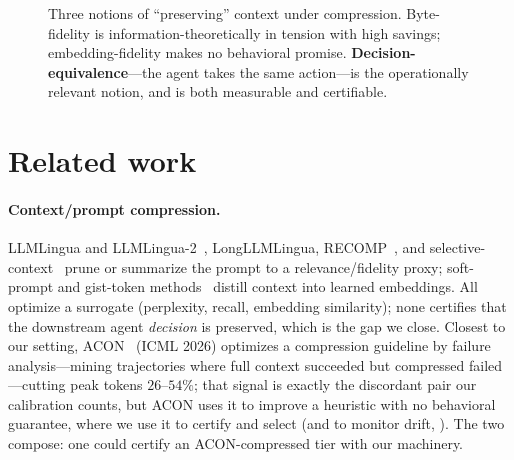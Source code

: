 \documentclass{article}
\begin{document}
\begin{figure}[t]
\centering
{}
\caption{Three notions of ``preserving'' context under compression. Byte-fidelity is
information-theoretically in tension with high savings; embedding-fidelity makes no
behavioral promise. \textbf{Decision-equivalence}---the agent takes the same
action---is the operationally relevant notion, and is both measurable and
certifiable.}
\label{fig:concept}
\end{figure}

\section{Related work}
\paragraph{Context/prompt compression.} LLMLingua and LLMLingua-2~\cite{llmlingua},
LongLLMLingua, RECOMP~\cite{recomp}, and selective-context~\cite{selectivecontext} prune
or summarize the prompt to a relevance/fidelity proxy; soft-prompt and gist-token
methods~\cite{gist} distill context into learned embeddings. All optimize a surrogate
(perplexity, recall, embedding similarity); none certifies that the downstream agent
\emph{decision} is preserved, which is the gap we close. Closest to our setting, ACON~\cite{acon}
(ICML 2026) optimizes a compression guideline by failure analysis---mining trajectories where
full context succeeded but compressed failed---cutting peak tokens $26$--$54\%$; that signal is
exactly the discordant pair our calibration counts, but ACON uses it to improve a heuristic with
no behavioral guarantee, where we use it to certify and select (and to monitor drift,
). The two compose: one could certify an ACON-compressed tier with our machinery.
\end{document}
